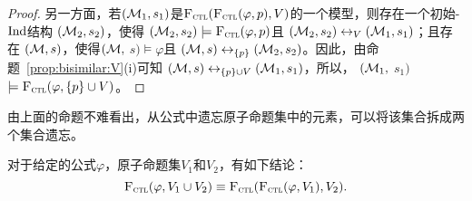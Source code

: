 \begin{proof}
	另一方面，若$({\cal M}_1, s_1)$是${\textsc{F}_{\textsc{ctl}}}({\textsc{F}_{\textsc{ctl}}}(\varphi, p), V)$的一个模型，则存在一个初始-$\textrm{Ind}$结构 $({\cal M}_2, s_2)$，使得 $({\cal M}_2, s_2) \models {\textsc{F}_{\textsc{ctl}}}(\varphi, p)$且 $({\cal M}_2, s_2) \leftrightarrow_V ({\cal M}_1, s_1)$；且存在 $({\cal M}, s)$，使得$({\cal M},$ $s) \models \varphi$且 $({\cal M}, s) \leftrightarrow_{\{p\}} ({\cal M}_2, s_2)$。因此，由命题~\ref{prop:bisimilar:V}(i)可知 $({\cal M}, s) \leftrightarrow_{\{p\} \cup V} ({\cal M}_1, s_1)$，所以， $({\cal M}_1,$ $s_1)$ $\models {\textsc{F}_{\textsc{ctl}}}(\varphi, \{p\} \cup V)$。
\end{proof}

由上面的命题不难看出，从公式中遗忘原子命题集中的元素，可以将该集合拆成两个集合遗忘。
\begin{corollary}
	对于给定的公式$\varphi$，原子命题集$V_1$和$V_2$，有如下结论：
	\[
	{\textsc{F}_{\textsc{ctl}}}(\varphi,V_1\cup V_2) \equiv {\textsc{F}_{\textsc{ctl}}}({\textsc{F}_{\textsc{ctl}}}(\varphi,V_1),V_2).
	\]
\end{corollary}

